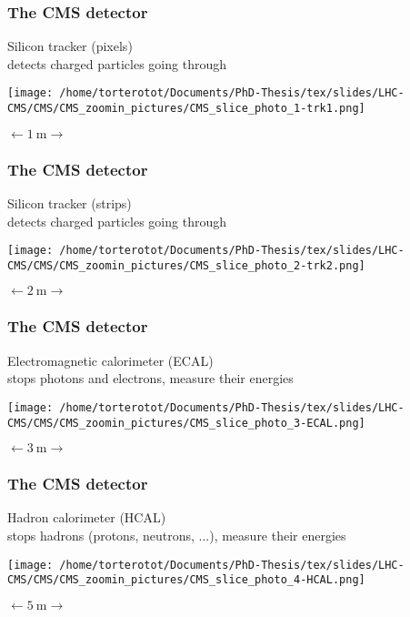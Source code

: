 \begin{frame}
\frametitle{The CMS detector}\pause
\begin{center}
Silicon tracker (pixels)\\
detects charged particles going through

\texttt{[image: /home/torterotot/Documents/PhD-Thesis/tex/slides/LHC-CMS/CMS/CMS\_zoomin\_pictures/CMS\_slice\_photo\_1-trk1.png]}

$\longleftarrow \SI{1}{\meter} \longrightarrow$
\end{center}
\end{frame}
\begin{frame}\addtocounter{framenumber}{-1}
\frametitle{The CMS detector}
\begin{center}
Silicon tracker (strips)\\
detects charged particles going through

\texttt{[image: /home/torterotot/Documents/PhD-Thesis/tex/slides/LHC-CMS/CMS/CMS\_zoomin\_pictures/CMS\_slice\_photo\_2-trk2.png]}

$\longleftarrow \SI{2}{\meter} \longrightarrow$
\end{center}
\end{frame}
\begin{frame}\addtocounter{framenumber}{-1}
\frametitle{The CMS detector}
\begin{center}
Electromagnetic calorimeter (ECAL)\\
stops photons and electrons, measure their energies

\texttt{[image: /home/torterotot/Documents/PhD-Thesis/tex/slides/LHC-CMS/CMS/CMS\_zoomin\_pictures/CMS\_slice\_photo\_3-ECAL.png]}

$\longleftarrow \SI{3}{\meter} \longrightarrow$
\end{center}
\end{frame}
\begin{frame}\addtocounter{framenumber}{-1}
\frametitle{The CMS detector}
\begin{center}
Hadron calorimeter (HCAL)\\
stops hadrons (protons, neutrons, ...), measure their energies

\texttt{[image: /home/torterotot/Documents/PhD-Thesis/tex/slides/LHC-CMS/CMS/CMS\_zoomin\_pictures/CMS\_slice\_photo\_4-HCAL.png]}

$\longleftarrow \SI{5}{\meter} \longrightarrow$
\end{center}
\end{frame}
